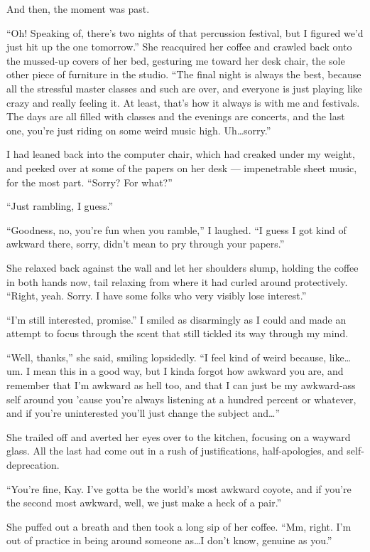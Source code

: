 And then, the moment was past.

``Oh! Speaking of, there's two nights of that percussion festival, but I figured we'd just hit up the one tomorrow.'' She reacquired her coffee and crawled back onto the mussed-up covers of her bed, gesturing me toward her desk chair, the sole other piece of furniture in the studio. ``The final night is always the best, because all the stressful master classes and such are over, and everyone is just playing like crazy and really feeling it. At least, that's how it always is with me and festivals. The days are all filled with classes and the evenings are concerts, and the last one, you're just riding on some weird music high. Uh\ldots sorry.''

I had leaned back into the computer chair, which had creaked under my weight, and peeked over at some of the papers on her desk --- impenetrable sheet music, for the most part. ``Sorry? For what?''

``Just rambling, I guess.''

``Goodness, no, you're fun when you ramble,'' I laughed. ``I guess I got kind of awkward there, sorry, didn't mean to pry through your papers.''

She relaxed back against the wall and let her shoulders slump, holding the coffee in both hands now, tail relaxing from where it had curled around protectively. ``Right, yeah. Sorry. I have some folks who very visibly lose interest.''

``I'm still interested, promise.'' I smiled as disarmingly as I could and made an attempt to focus through the scent that still tickled its way through my mind.

``Well, thanks,'' she said, smiling lopsidedly. ``I feel kind of weird because, like\ldots um. I mean this in a good way, but I kinda forgot how awkward you are, and remember that I'm awkward as hell too, and that I can just be my awkward-ass self around you 'cause you're always listening at a hundred percent or whatever, and if you're uninterested you'll just change the subject and\ldots{}''

She trailed off and averted her eyes over to the kitchen, focusing on a wayward glass. All the last had come out in a rush of justifications, half-apologies, and self-deprecation.

``You're fine, Kay. I've gotta be the world's most awkward coyote, and if you're the second most awkward, well, we just make a heck of a pair.''

She puffed out a breath and then took a long sip of her coffee. ``Mm, right. I'm out of practice in being around someone as\ldots I don't know, genuine as you.''


